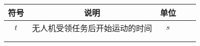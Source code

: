 \documentclass[../main.tex]{subfiles}
\begin{document}




\begin{table}[H]
\centering
\tabcolsep=2cm%
\begin{tabular}{ccccc}
\toprule[1.5pt]
符号 & 说明 & 单位  \\ 
\midrule[1pt]
$t$       & 无人机受领任务后开始运动的时间       &  $s$                  \\
&         &                 \\
&         &                 \\

\bottomrule[1.5pt]
\end{tabular}
\end{table}
\end{document}
